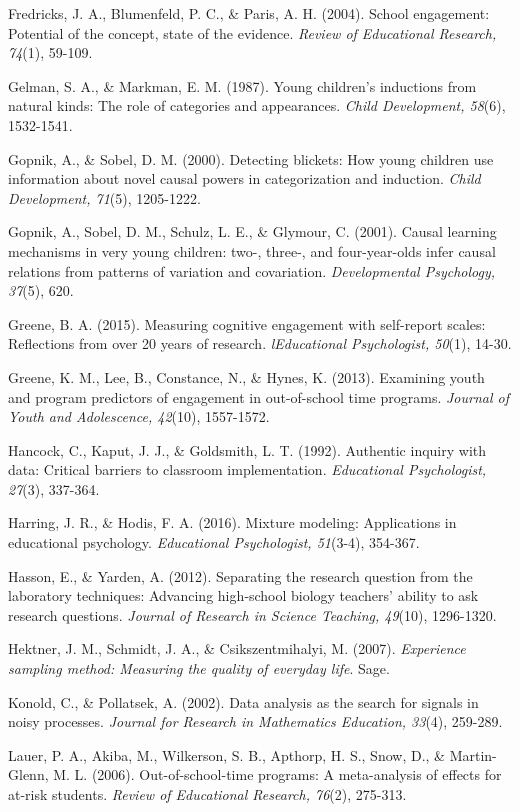 \documentclass[]{msu-thesis}
\theoremstyle{definition}
\theoremstyle{definition}
\theoremstyle{definition}
\theoremstyle{remark}
\begin{document}
Fredricks, J. A., Blumenfeld, P. C., \& Paris, A. H. (2004). School
engagement: Potential of the concept, state of the evidence.
\emph{Review of Educational Research, 74}(1), 59-109.

Gelman, S. A., \& Markman, E. M. (1987). Young children's inductions
from natural kinds: The role of categories and appearances. \emph{Child
Development, 58}(6), 1532-1541.

Gopnik, A., \& Sobel, D. M. (2000). Detecting blickets: How young
children use information about novel causal powers in categorization and
induction. \emph{Child Development, 71}(5), 1205-1222.

Gopnik, A., Sobel, D. M., Schulz, L. E., \& Glymour, C. (2001). Causal
learning mechanisms in very young children: two-, three-, and
four-year-olds infer causal relations from patterns of variation and
covariation. \emph{Developmental Psychology, 37}(5), 620.

Greene, B. A. (2015). Measuring cognitive engagement with self-report
scales: Reflections from over 20 years of research. \emph{lEducational
Psychologist, 50}(1), 14-30.

Greene, K. M., Lee, B., Constance, N., \& Hynes, K. (2013). Examining
youth and program predictors of engagement in out-of-school time
programs. \emph{Journal of Youth and Adolescence, 42}(10), 1557-1572.

Hancock, C., Kaput, J. J., \& Goldsmith, L. T. (1992). Authentic inquiry
with data: Critical barriers to classroom implementation.
\emph{Educational Psychologist, 27}(3), 337-364.

Harring, J. R., \& Hodis, F. A. (2016). Mixture modeling: Applications
in educational psychology. \emph{Educational Psychologist, 51}(3-4),
354-367.

Hasson, E., \& Yarden, A. (2012). Separating the research question from
the laboratory techniques: Advancing high‐school biology teachers'
ability to ask research questions. \emph{Journal of Research in Science
Teaching, 49}(10), 1296-1320.

Hektner, J. M., Schmidt, J. A., \& Csikszentmihalyi, M. (2007).
\emph{Experience sampling method: Measuring the quality of everyday
life}. Sage.

Konold, C., \& Pollatsek, A. (2002). Data analysis as the search for
signals in noisy processes. \emph{Journal for Research in Mathematics
Education, 33}(4), 259-289.

Lauer, P. A., Akiba, M., Wilkerson, S. B., Apthorp, H. S., Snow, D., \&
Martin-Glenn, M. L. (2006). Out-of-school-time programs: A meta-analysis
of effects for at-risk students. \emph{Review of Educational Research,
76}(2), 275-313.
\end{document}
